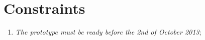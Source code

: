 \section{Constraints}
\thispagestyle{fancy}
\begin{enumerate}
\item \emph{The prototype must be ready before the 2nd of October 2013};
\end{enumerate}